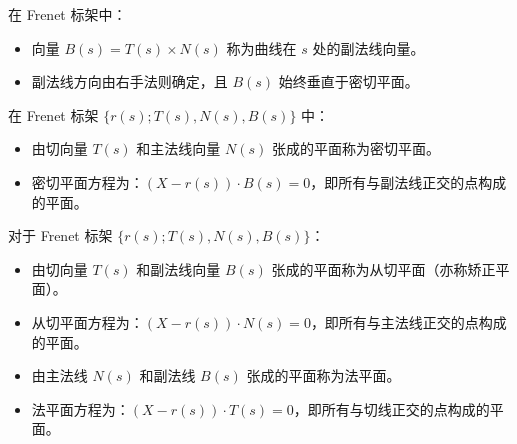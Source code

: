 \documentclass[lang=cn,10pt,thmcnt=section]{elegantbook}
\begin{document}
\begin{definition}[副法线]
    在 Frenet 标架中：
    \begin{itemize}
        \item 向量 $B(s) = T(s) \times N(s)$ 称为曲线在 $s$ 处的副法线向量。
        \item 副法线方向由右手法则确定，且 $B(s)$ 始终垂直于密切平面。
    \end{itemize}
\end{definition}

\begin{definition}[密切平面]
    在 Frenet 标架 $\{r(s); T(s), N(s), B(s)\}$ 中：
    \begin{itemize}
        \item 由切向量 $T(s)$ 和主法线向量 $N(s)$ 张成的平面称为密切平面。
        \item 密切平面方程为：$(X - r(s)) \cdot B(s) = 0$，即所有与副法线正交的点构成的平面。
    \end{itemize}
\end{definition}
\begin{definition}[从切平面]
    对于 Frenet 标架 $\{r(s); T(s), N(s), B(s)\}$：
    \begin{itemize}
        \item 由切向量 $T(s)$ 和副法线向量 $B(s)$ 张成的平面称为从切平面（亦称矫正平面）。
        \item 从切平面方程为：$(X - r(s)) \cdot N(s) = 0$，即所有与主法线正交的点构成的平面。
    \end{itemize}
\end{definition}
\begin{definition}[法平面]
    \begin{itemize}
        \item 由主法线 $N(s)$ 和副法线 $B(s)$ 张成的平面称为法平面。
        \item 法平面方程为：$(X - r(s)) \cdot T(s) = 0$，即所有与切线正交的点构成的平面。
    \end{itemize}
\end{definition}
\end{document}

